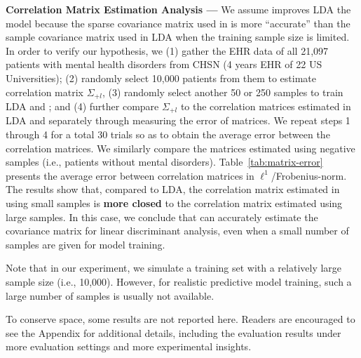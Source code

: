 


\textbf{Correlation Matrix Estimation Analysis --- } We assume \TheName{} improves LDA the model because the sparse covariance matrix used in \TheName{} is more ``accurate'' than the sample covariance matrix used in LDA when the training sample size is limited. 
In order to verify our hypothesis, we (1) gather the EHR data of all 21,097 patients with mental health disorders from CHSN (4 years EHR of 22 US Universities); (2) randomly select 10,000 patients from them to estimate correlation matrix $\Sigma_{+l}$, (3) randomly select another 50 or 250 samples to train LDA and \TheName{}; and (4) further compare $\Sigma_{+l}$ to the correlation matrices estimated in LDA and \TheName{} separately through measuring the error of matrices. 
We repeat steps 1 through 4 for a total 30 trials so as to obtain the average error between the correlation matrices. 
We similarly compare the matrices estimated using negative samples (i.e., patients without mental disorders).
Table~\ref{tab:matrix-error} presents the average error between correlation matrices in $\ell^1$/Frobenius-norm. 
%
The results show that, compared to LDA, the correlation matrix estimated in \TheName{} using small samples is \textbf{more closed} to the correlation matrix estimated using large samples. 
In this case, we conclude that \TheName{} can accurately estimate the covariance matrix for linear discriminant analysis, even when a small number of samples are given for model training. 

Note that in our experiment, we simulate a training set with a relatively large sample size (i.e., 10,000). 
However, for realistic predictive model training, such a large number of samples is usually not available.


To conserve space, some results are not reported here. 
Readers are encouraged to see the Appendix for additional details, including the evaluation results under more evaluation settings and more experimental insights.
